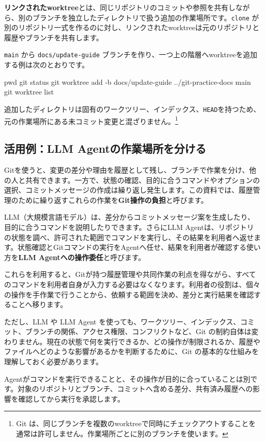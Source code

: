 \documentclass[a4paper,11pt]{jlreq}
\newcommand{\cmd}[1]{\texttt{#1}}
\newcommand{\term}[1]{\textbf{#1}}
\begin{document}
\term{リンクされたworktree}とは、同じリポジトリのコミットや参照を共有しながら、別のブランチを独立したディレクトリで扱う追加の作業場所です。\cmd{clone} が別のリポジトリ一式を作るのに対し、リンクされたworktreeは元のリポジトリと履歴やブランチを共有します。

\cmd{main} から \cmd{docs/update-guide} ブランチを作り、一つ上の階層へworktreeを追加する例は次のとおりです。

\begin{codeblock}
pwd
git status
git worktree add -b docs/update-guide ../git-practice-docs main
git worktree list
\end{codeblock}

追加したディレクトリは固有のワークツリー、インデックス、\cmd{HEAD}を持つため、元の作業場所にある未コミット変更と混ざりません。\footnote{Git は、同じブランチを複数のworktreeで同時にチェックアウトすることを通常は許可しません。作業場所ごとに別のブランチを使います。}

\subsection{活用例：LLM Agentの作業場所を分ける}

Gitを使うと、変更の差分や理由を履歴として残し、ブランチで作業を分け、他の人と共有できます。一方で、状態の確認、目的に合うコマンドやオプションの選択、コミットメッセージの作成は繰り返し発生します。この資料では、履歴管理のために繰り返すこれらの作業を\term{Git操作の負担}と呼びます。

LLM（大規模言語モデル）は、差分からコミットメッセージ案を生成したり、目的に合うコマンドを説明したりできます。さらにLLM Agentは、リポジトリの状態を調べ、許可された範囲でコマンドを実行し、その結果を利用者へ返せます。状態確認とGitコマンドの実行をAgentへ任せ、結果を利用者が確認する使い方を\term{LLM Agentへの操作委任}と呼びます。

これらを利用すると、Gitが持つ履歴管理や共同作業の利点を得ながら、すべてのコマンドを利用者自身が入力する必要はなくなります。利用者の役割は、個々の操作を手作業で行うことから、依頼する範囲を決め、差分と実行結果を確認することへ移ります。

ただし、LLM や LLM Agent を使っても、ワークツリー、インデックス、コミット、ブランチの関係、アクセス権限、コンフリクトなど、Git の制約自体は変わりません。現在の状態で何を実行できるか、どの操作が制限されるか、履歴やファイルへどのような影響があるかを判断するために、Git の基本的な仕組みを理解しておく必要があります。

Agentがコマンドを実行できることと、その操作が目的に合っていることは別です。対象のリポジトリとブランチ、コミットへ含める差分、共有済み履歴への影響を確認してから実行を承認します。
\end{document}
